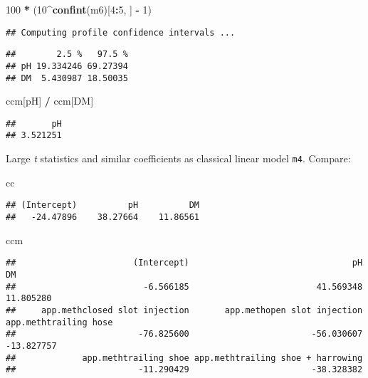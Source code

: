 \documentclass[
]{article}
\newenvironment{Shaded}{\begin{snugshade}}{\end{snugshade}}
\newcommand{\DecValTok}[1]{\textcolor[rgb]{0.00,0.00,0.81}{#1}}
\newcommand{\FunctionTok}[1]{\textcolor[rgb]{0.13,0.29,0.53}{\textbf{#1}}}
\newcommand{\NormalTok}[1]{#1}
\newcommand{\SpecialCharTok}[1]{\textcolor[rgb]{0.81,0.36,0.00}{\textbf{#1}}}
\newcommand{\StringTok}[1]{\textcolor[rgb]{0.31,0.60,0.02}{#1}}
\begin{document}
\begin{Shaded}
\begin{Highlighting}[]
\DecValTok{100} \SpecialCharTok{*}\NormalTok{ (}\DecValTok{10}\SpecialCharTok{\^{}}\FunctionTok{confint}\NormalTok{(m6)[}\DecValTok{4}\SpecialCharTok{:}\DecValTok{5}\NormalTok{, ] }\SpecialCharTok{{-}} \DecValTok{1}\NormalTok{)}
\end{Highlighting}
\end{Shaded}

\begin{verbatim}
## Computing profile confidence intervals ...
\end{verbatim}

\begin{verbatim}
##        2.5 %   97.5 %
## pH 19.334246 69.27394
## DM  5.430987 18.50035
\end{verbatim}

\begin{Shaded}
\begin{Highlighting}[]
\NormalTok{ccm[}\StringTok{\textquotesingle{}pH\textquotesingle{}}\NormalTok{] }\SpecialCharTok{/}\NormalTok{ ccm[}\StringTok{\textquotesingle{}DM\textquotesingle{}}\NormalTok{]}
\end{Highlighting}
\end{Shaded}

\begin{verbatim}
##       pH 
## 3.521251
\end{verbatim}

Large \emph{t} statistics and similar coefficients as classical linear
model \texttt{m4}. Compare:

\begin{Shaded}
\begin{Highlighting}[]
\NormalTok{cc}
\end{Highlighting}
\end{Shaded}

\begin{verbatim}
## (Intercept)          pH          DM 
##   -24.47896    38.27664    11.86561
\end{verbatim}

\begin{Shaded}
\begin{Highlighting}[]
\NormalTok{ccm}
\end{Highlighting}
\end{Shaded}

\begin{verbatim}
##                       (Intercept)                                pH                                DM 
##                         -6.566185                         41.569348                         11.805280 
##     app.methclosed slot injection       app.methopen slot injection             app.methtrailing hose 
##                        -76.825600                        -56.030607                        -13.827757 
##             app.methtrailing shoe app.methtrailing shoe + harrowing 
##                        -11.290429                        -38.328382
\end{verbatim}
\end{document}
